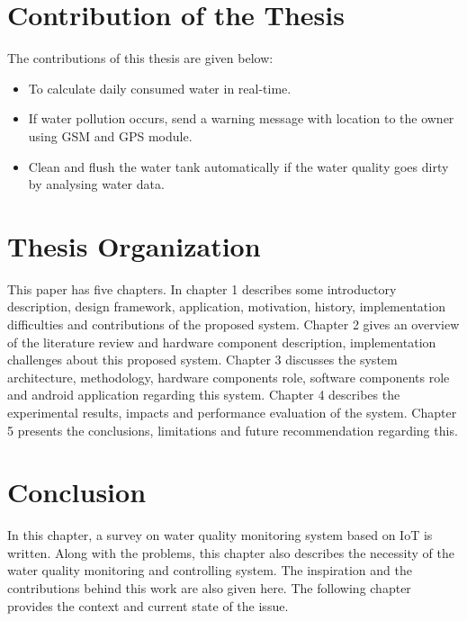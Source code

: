 
\section{Contribution of the Thesis}
The contributions of this thesis are given below:
\begin{itemize}
\item To calculate daily consumed water in real-time.
\item If water pollution occurs, send a warning message with location to the owner using GSM and GPS module.
\item Clean and flush the water tank automatically if the water quality goes dirty by analysing water data.
\end{itemize}

\section{Thesis Organization}
This paper has five chapters.
In chapter 1 describes some introductory description, design framework, application, motivation, history, implementation difficulties and contributions of the proposed system.
Chapter 2 gives an overview of the literature review and hardware component description, implementation challenges about this proposed system.
Chapter 3 discusses the system architecture, methodology, hardware components role, software components role and android application regarding this system.
Chapter 4 describes the experimental results, impacts and performance evaluation of the system.
Chapter 5 presents the conclusions, limitations and future recommendation regarding this.

\section{Conclusion}
In this chapter, a survey on water quality monitoring system based on IoT is written. Along with the problems, this chapter also describes the necessity of the water quality monitoring and controlling system. The inspiration and the contributions behind this work are also given here. The following chapter provides the context and current state of the issue.

